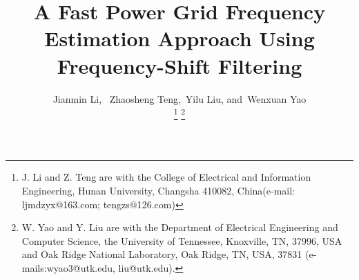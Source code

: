 \documentclass[journal,twoside]{IEEEtran}
\begin{document}
%
\title{A Fast Power Grid Frequency Estimation Approach Using Frequency-Shift Filtering}
%
%
%
\author{Jianmin  Li,~
		Zhaosheng Teng,~Yilu Liu,
		and~Wenxuan Yao%
		
			
		\thanks{J.  Li and Z. Teng are with the College of Electrical and Information Engineering, Hunan University, Changsha 410082, China(e-mail: ljmdzyx@163.com; tengzs@126.com)} %
		\thanks{W. Yao and Y. Liu are with the Department of Electrical Engineering and Computer Science, the University of Tennessee, Knoxville, TN, 37996, USA and Oak Ridge National Laboratory, Oak Ridge, TN, USA, 37831 (e-mails:wyao3@utk.edu, liu@utk.edu).}
		}%

% 
%
\end{document}
